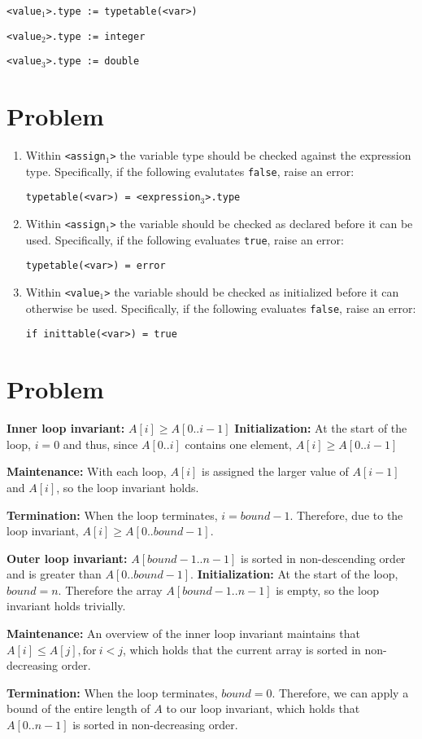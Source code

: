 \documentclass[letterpaper]{article}
\newcommand{\problem}{\section{Problem}}
\newenvironment{shift}
    {\adjustwidth{3em}{0pt}}
    {\endadjustwidth}
\begin{document}
\texttt{<value$_1$>.type := typetable(<var>)}

\texttt{<value$_2$>.type := integer}

\texttt{<value$_3$>.type := double}

\problem{}
\begin{enumerate}
\item Within \texttt{<assign$_1$>} the variable type should be checked against the expression type. Specifically, if the following evalutates \texttt{false}, raise an error:

\texttt{typetable(<var>) = <expression$_3$>.type}

\item Within \texttt{<assign$_1$>} the variable should be checked as declared before it can be used. Specifically, if the following evaluates \texttt{true}, raise an error:

\texttt{typetable(<var>) = error}

\item Within \texttt{<value$_1$>} the variable should be checked as initialized before it can otherwise be used. Specifically, if the following evaluates \texttt{false}, raise an error:

\texttt{if inittable(<var>) = true}
\end{enumerate}

\problem{}
\textbf{Inner loop invariant:} $A[i]\geq A[0..i-1]$
\begin{shift}
    \textbf{Initialization:} At the start of the loop, $i = 0$ and thus, since $A[0..i]$ contains one element, ${A[i]\geq A[0..i-1]}$

    \textbf{Maintenance:} With each loop, $A[i]$ is assigned the larger value of $A[i-1]$ and $A[i]$, so the loop invariant holds.

    \textbf{Termination:} When the loop terminates, $i=bound-1$. Therefore, due to the loop invariant, $A[i]\geq A[0..bound-1]$.
\end{shift}

\textbf{Outer loop invariant:} $A[bound-1..n-1]$ is sorted in non-descending order and is greater than $A[0..bound-1]$.
\begin{shift}
    \textbf{Initialization:} At the start of the loop, $bound=n$. Therefore the array $A[bound-1..n-1]$ is empty, so the loop invariant holds trivially.

    \textbf{Maintenance:} An overview of the inner loop invariant maintains that $A[i]\leq A[j], \text{for}\ i<j$, which holds that the current array is sorted in non-decreasing order.

    \textbf{Termination:} When the loop terminates, $bound=0$. Therefore, we can apply a bound of the entire length of $A$ to our loop invariant, which holds that $A[0..n-1]$ is sorted in non-decreasing order.
\end{shift}
\end{document}
